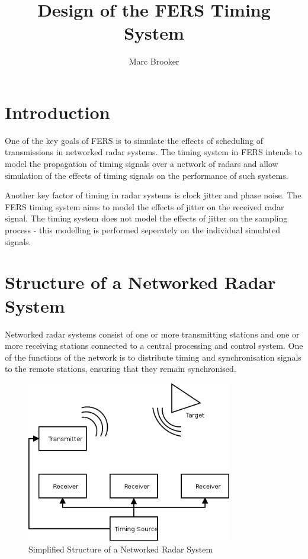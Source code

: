 \documentclass[a4paper,10pt]{article}
\title{Design of the FERS Timing System}
\author{Marc Brooker}
\begin{document}
\maketitle

\begin{abstract}
\end{abstract}

\section{Introduction}
One of the key goals of FERS is to simulate the effects of scheduling of transmissions in networked radar systems. The timing system in FERS intends to model the propagation of timing signals over a network of radars and allow simulation of the effects of timing signals on the performance of such systems.

Another key factor of timing in radar systems is clock jitter and phase noise. The FERS timing system aims to model the effects of jitter on the received radar signal. The timing system does not model the effects of jitter on the sampling process - this modelling is performed seperately on the individual simulated signals.

\section{Structure of a Networked Radar System}
Networked radar systems consist of one or more transmitting stations and one or more receiving stations connected to a central processing and control system. One of the functions of the network is to distribute timing and synchronisation signals to the remote stations, ensuring that they remain synchronised.

\begin{figure}
\centering
\includegraphics[width=0.8\textwidth]{model}
\caption{Simplified Structure of a Networked Radar System}
\label{fig_block}
\end{figure}
\end{document}
